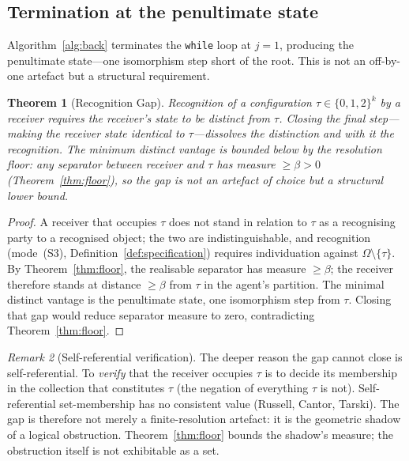 \documentclass[twocolumn,10pt,a4paper]{article}
\theoremstyle{thmstyle}
\newtheorem{theorem}{Theorem}[section]
\theoremstyle{definition}
\theoremstyle{remark}
\newtheorem{remark}[theorem]{Remark}
\begin{document}
\subsection{Termination at the penultimate state}

Algorithm~\ref{alg:back} terminates the \texttt{while} loop at $j=1$,
producing the penultimate state---one isomorphism step short of the
root. This is not an off-by-one artefact but a structural requirement.

\begin{theorem}[Recognition Gap]
\label{thm:recog}
Recognition of a configuration $\tau\in\{0,1,2\}^{k}$ by a receiver
requires the receiver's state to be distinct from $\tau$. Closing the
final step---making the receiver state identical to $\tau$---dissolves
the distinction and with it the recognition. The minimum distinct
vantage is bounded below by the resolution floor: any separator
between receiver and $\tau$ has measure $\geq\beta>0$
(Theorem~\ref{thm:floor}), so the gap is not an artefact of choice
but a structural lower bound.
\end{theorem}

\begin{proof}
A receiver that occupies $\tau$ does not stand in relation to $\tau$
as a recognising party to a recognised object; the two are
indistinguishable, and recognition (mode~(S3),
Definition~\ref{def:specification}) requires individuation against
$\Omega\setminus\{\tau\}$. By Theorem~\ref{thm:floor}, the realisable
separator has measure $\geq\beta$; the receiver therefore stands at
distance $\geq\beta$ from $\tau$ in the agent's partition. The
minimal distinct vantage is the penultimate state, one isomorphism
step from $\tau$. Closing that gap would reduce separator measure to
zero, contradicting Theorem~\ref{thm:floor}.
\end{proof}

\begin{remark}[Self-referential verification]
\label{rem:selfref}
The deeper reason the gap cannot close is self-referential. To
\emph{verify} that the receiver occupies $\tau$ is to decide its
membership in the collection that constitutes $\tau$ (the negation
of everything $\tau$ is not). Self-referential set-membership has
no consistent value (Russell, Cantor, Tarski). The gap is therefore
not merely a finite-resolution artefact: it is the geometric
shadow of a logical obstruction. Theorem~\ref{thm:floor} bounds the
shadow's measure; the obstruction itself is not exhibitable as a set.
\end{remark}
\end{document}
